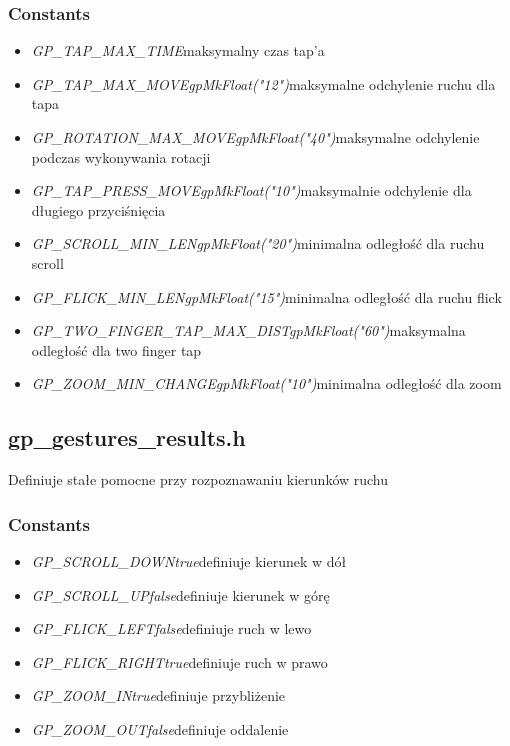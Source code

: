 \subsubsection{Constants}
\begin{itemize} 
\item \textit{GP_TAP_MAX_TIME}\qquad maksymalny czas tap'a
\item \textit{GP_TAP_MAX_MOVE\quad gpMkFloat("12")}\qquad maksymalne odchylenie ruchu dla tapa
\item \textit{GP_ROTATION_MAX_MOVE\quad gpMkFloat("40")}\qquad maksymalne odchylenie podczas wykonywania rotacji
\item \textit{GP_TAP_PRESS_MOVE\quad gpMkFloat("10")}\qquad maksymalnie odchylenie dla długiego przyciśnięcia
\item \textit{GP_SCROLL_MIN_LEN\quad gpMkFloat("20")}\qquad minimalna odległość dla ruchu scroll
\item \textit{GP_FLICK_MIN_LEN\quad gpMkFloat("15")}\qquad minimalna odległość dla ruchu flick
\item \textit{GP_TWO_FINGER_TAP_MAX_DIST\quad gpMkFloat("60")}\qquad maksymalna odległość dla two finger tap
\item \textit{GP_ZOOM_MIN_CHANGE\quad gpMkFloat("10")}\qquad minimalna odległość dla zoom
\end{itemize}

\subsection{gp_gestures_results.h}
Definiuje stałe pomocne przy rozpoznawaniu kierunków ruchu
\subsubsection{Constants}
\begin{itemize}
\item \textit{GP_SCROLL_DOWN\quad true}\qquad definiuje kierunek w dół
\item \textit{GP_SCROLL_UP\quad false}\qquad definiuje kierunek w górę
\item \textit{GP_FLICK_LEFT\quad false}\qquad definiuje ruch w lewo
\item \textit{GP_FLICK_RIGHT\quad true}\qquad definiuje ruch w prawo
\item \textit{GP_ZOOM_IN\quad true}\qquad definiuje przybliżenie
\item \textit{GP_ZOOM_OUT\quad false}\qquad definiuje oddalenie
\end{itemize}

